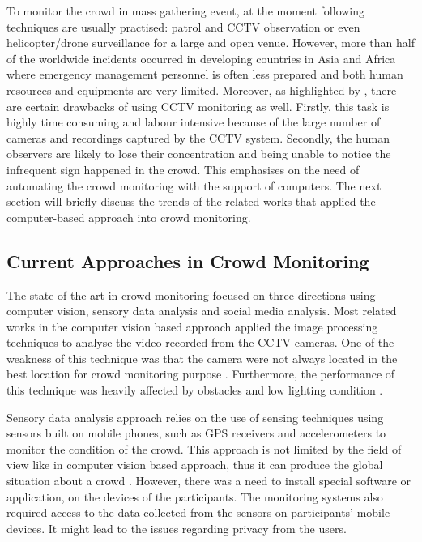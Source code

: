 To monitor the crowd in mass gathering event, at the moment following techniques are usually practised: patrol and CCTV observation or even helicopter/drone surveillance for a large and open venue. However, more than half of the worldwide incidents occurred in developing countries in Asia and Africa \citep{BurkleJr2011} where emergency management personnel is often less prepared and both human resources and equipments are very limited. Moreover, as highlighted by \citet{Davies1995}, there are certain drawbacks of using CCTV monitoring as well. Firstly, this task is highly time consuming and labour intensive because of the large number of cameras and recordings captured by the CCTV system. Secondly, the human observers are likely to lose their concentration and being unable to notice the infrequent sign happened in the crowd. This emphasises on the need of automating the crowd monitoring with the support of computers. The next section will briefly discuss the trends of the related works that applied the computer-based approach into crowd monitoring.

\subsection{Current Approaches in Crowd Monitoring}
The state-of-the-art in crowd monitoring focused on three directions using computer vision, sensory data analysis and social media analysis. Most related works in the computer vision based approach applied the image processing techniques to analyse the video recorded from the CCTV cameras. One of the weakness of this technique was that the camera were not always located in the best location for crowd monitoring purpose \citep{Davies1995}. Furthermore, the performance of this technique was heavily affected by obstacles and low lighting condition \citep{Wirz2012}.

Sensory data analysis approach relies on the use of sensing techniques using sensors built on mobile phones, such as GPS receivers \citep{Wirz2012} and accelerometers \citep{Roggen2011} to monitor the condition of the crowd. This approach is not limited by the field of view like in computer vision based approach, thus it can produce the global situation about a crowd \citep{Wirz2012}. However, there was a need to install special software or application, on the devices of the participants. The monitoring systems also required access to the data collected from the sensors on participants' mobile devices. It might lead to the issues regarding privacy from the users.

